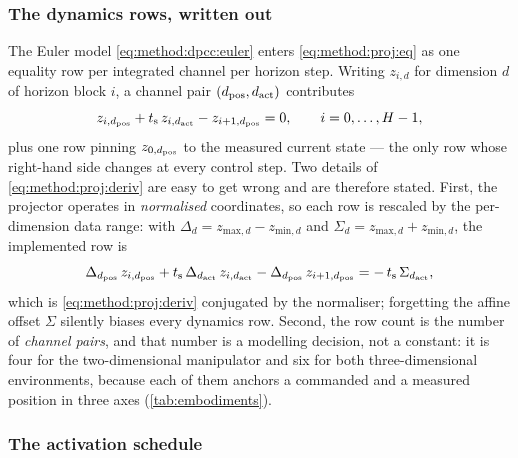 \subsubsection*{The dynamics rows, written out}

The Euler model \eqref{eq:method:dpcc:euler} enters \eqref{eq:method:proj:eq} as one equality row per
integrated channel per horizon step. Writing $z_{i,d}$ for dimension $d$ of horizon block $i$, a
channel pair $(d_{\textrm{pos}},d_{\textrm{act}})$ contributes
\begin{equation}\label{eq:method:proj:deriv}
  z_{i,d_{\textrm{pos}}} + t_{\textrm{s}}\,z_{i,d_{\textrm{act}}} - z_{i+1,d_{\textrm{pos}}} = 0,
  \qquad i = 0,\dots,H-1,
\end{equation}
plus one row pinning $z_{0,d_{\textrm{pos}}}$ to the measured current state --- the only row whose
right-hand side changes at every control step. Two details of \eqref{eq:method:proj:deriv} are easy
to get wrong and are therefore stated. First, the projector operates in \emph{normalised}
coordinates, so each row is rescaled by the per-dimension data range: with
$\Delta_{d} = z_{\textrm{max},d} - z_{\textrm{min},d}$ and
$\Sigma_{d} = z_{\textrm{max},d} + z_{\textrm{min},d}$, the implemented row is
\begin{equation}\label{eq:method:proj:derivnorm}
  \Delta_{d_{\textrm{pos}}}\,z_{i,d_{\textrm{pos}}}
  + t_{\textrm{s}}\,\Delta_{d_{\textrm{act}}}\,z_{i,d_{\textrm{act}}}
  - \Delta_{d_{\textrm{pos}}}\,z_{i+1,d_{\textrm{pos}}}
  = -\,t_{\textrm{s}}\,\Sigma_{d_{\textrm{act}}} ,
\end{equation}
which is \eqref{eq:method:proj:deriv} conjugated by the normaliser; forgetting the affine offset
$\Sigma$ silently biases every dynamics row. Second, the row count is the number of
\emph{channel pairs}, and that number is a modelling decision, not a constant: it is four for the
two-dimensional manipulator and six for both three-dimensional environments, because each of them
anchors a commanded and a measured position in three axes
(\autoref{tab:embodiments}).

\subsubsection*{The activation schedule}

